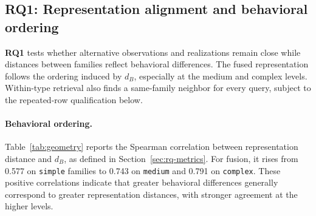 \documentclass[mathematics,article,submit,moreauthors]{Definitions/mdpi}
\newcommand{\RQone}{\textbf{RQ1}}
\begin{document}
\subsection{\RQone: Representation alignment and behavioral ordering}

\RQone{} tests whether alternative observations and realizations remain close while distances between families reflect behavioral differences. The fused representation follows the ordering induced by $d_B$, especially at the medium and complex levels. Within-type retrieval also finds a same-family neighbor for every query, subject to the repeated-row qualification below.

\paragraph{Behavioral ordering.}
Table~\ref{tab:geometry} reports the Spearman correlation between representation distance and $d_B$, as defined in Section~\ref{sec:rq-metrics}. For fusion, it rises from 0.577 on \texttt{simple} families to 0.743 on \texttt{medium} and 0.791 on \texttt{complex}. These positive correlations indicate that greater behavioral differences generally correspond to greater representation distances, with stronger agreement at the higher levels.
\end{document}
